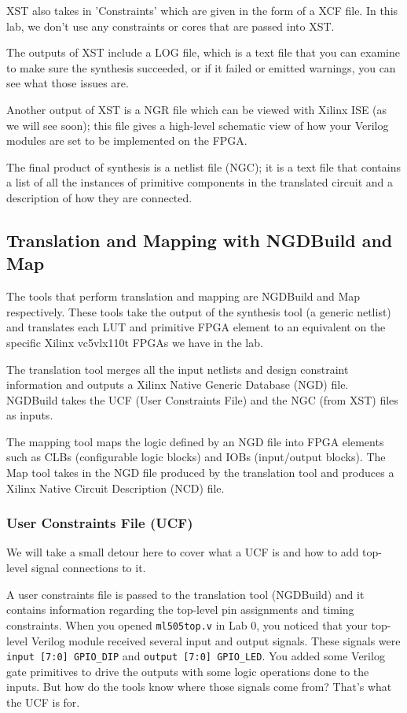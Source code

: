 \documentclass[11pt]{article}
\begin{document}
XST also takes in 'Constraints' which are given in the form of a XCF file. In this lab, we don't use any constraints or cores that are passed into XST.

The outputs of XST include a LOG file, which is a text file that you can examine to make sure the synthesis succeeded, or if it failed or emitted warnings, you can see what those issues are.

Another output of XST is a NGR file which can be viewed with Xilinx ISE (as we will see soon); this file gives a high-level schematic view of how your Verilog modules are set to be implemented on the FPGA.

The final product of synthesis is a netlist file (NGC); it is a text file that contains a list of all the instances of primitive components in the translated circuit and a description of how they are connected.

\subsection{Translation and Mapping with NGDBuild and Map}
The tools that perform translation and mapping are NGDBuild and Map respectively. These tools take the output of the synthesis tool (a generic netlist) and translates each LUT and primitive FPGA element to an equivalent on the specific Xilinx vc5vlx110t FPGAs we have in the lab. 

The translation tool merges all the input netlists and design constraint information and outputs a Xilinx Native Generic Database (NGD) file. NGDBuild takes the UCF (User Constraints File) and the NGC (from XST) files as inputs.

The mapping tool maps the logic defined by an NGD file into FPGA elements such as CLBs (configurable logic blocks) and IOBs (input/output blocks). The Map tool takes in the NGD file produced by the translation tool and produces a Xilinx Native Circuit Description (NCD) file.

\subsubsection{User Constraints File (UCF)}
We will take a small detour here to cover what a UCF is and how to add top-level signal connections to it.

A user constraints file is passed to the translation tool (NGDBuild) and it contains information regarding the top-level pin assignments and timing constraints. When you opened \verb|ml505top.v| in Lab 0, you noticed that your top-level Verilog module received several input and output signals. These signals were \verb|input [7:0] GPIO_DIP| and \verb|output [7:0] GPIO_LED|. You added some Verilog gate primitives to drive the outputs with some logic operations done to the inputs. But how do the tools know where those signals come from? That's what the UCF is for.
\end{document}
